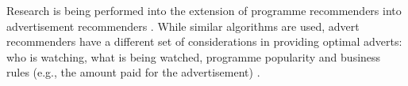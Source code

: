 	Research is being performed into the extension of programme recommenders into advertisement recommenders \cite{contextual_advertising}. While similar algorithms are used, advert recommenders have a different set of considerations in providing optimal adverts: who is watching, what is being watched, programme popularity and business rules (e.g., the amount paid for the advertisement) \cite{contextual_advertising}.


